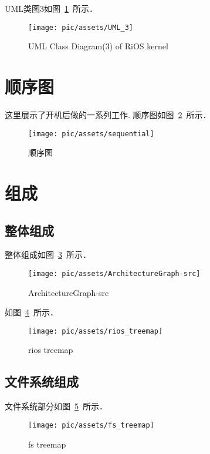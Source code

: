 UML类图3如图~\ref{UML_3}~所示．	

     \begin{figure}[!htbp]
            \centering	\texttt{[image: pic/assets/UML\_3]}
            \caption{UML Class Diagram(3) of RiOS kernel}	\label{UML_3}	\end{figure}            

\section{顺序图}
这里展示了开机后做的一系列工作.
顺序图如图~\ref{sequential}~所示．	

     \begin{figure}[!htbp]
            \centering	\texttt{[image: pic/assets/sequential]}
            \caption{顺序图}	\label{sequential}	\end{figure} 

\section{组成}

\subsection{整体组成}
整体组成如图~\ref{ArchitectureGraph-src}~所示．	

\begin{figure}[!htbp]
       \centering	\texttt{[image: pic/assets/ArchitectureGraph-src]}
       \caption{ArchitectureGraph-src}	\label{ArchitectureGraph-src}	\end{figure} 

如图~\ref{rios_treemap}~所示．	

     \begin{figure}[!htbp]
            \centering	\texttt{[image: pic/assets/rios\_treemap]}
            \caption{rios treemap}	\label{rios_treemap}	\end{figure} 

\subsection{文件系统组成}
文件系统部分如图~\ref{fs_treemap}~所示．	

     \begin{figure}[!htbp]
            \centering	\texttt{[image: pic/assets/fs\_treemap]}
            \caption{fs treemap}	\label{fs_treemap}	\end{figure} 

